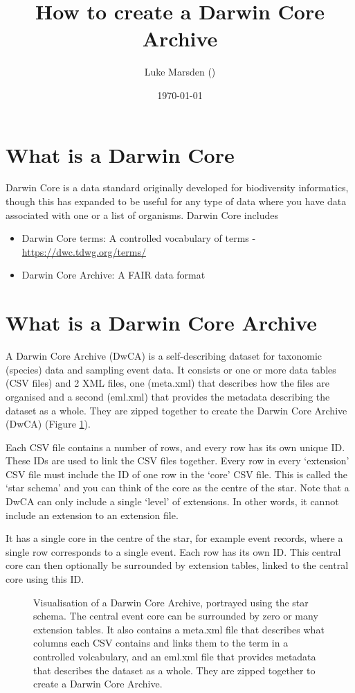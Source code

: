 \documentclass[a4paper,english, 11pt]{article}
\title{How to create a Darwin Core Archive}
\date{\today}
\author{Luke Marsden (\emailme)}
\begin{document}
\maketitle
\tableofcontents
\newpage

\section{What is a Darwin Core}
\label{s:dwc}

Darwin Core is a data standard originally developed for biodiversity informatics, though this has expanded to be useful for any type of data where you have data associated with one or a list of organisms. Darwin Core includes
\begin{itemize}
\item Darwin Core terms: A controlled vocabulary of terms - \url{https://dwc.tdwg.org/terms/}
\item Darwin Core Archive: A FAIR data format
\end{itemize} 

\section{What is a Darwin Core Archive}
\label{s:dwca}

A Darwin Core Archive (DwCA) is a self-describing dataset for taxonomic (species) data and sampling event data. It consists or one or more data tables (CSV files) and 2 XML files, one (meta.xml) that describes how the files are organised and a second  (eml.xml) that provides the metadata describing the dataset as a whole. They are zipped together to create the Darwin Core Archive (DwCA) (Figure \ref{fig:dwca}). 

Each CSV file contains a number of rows, and every row has its own unique ID. These IDs are used to link the CSV files together. Every row in every `extension' CSV file must include the ID of one row in the `core' CSV file. This is called the `star schema' and you can think of the core as the centre of the star. Note that a DwCA can only include a single `level' of extensions. In other words, it cannot include an extension to an extension file.


It has a single core in the centre of the star, for example event records, where a single row corresponds to a single event. 
Each row has its own ID.  
This central core can then optionally be surrounded by extension tables, linked to the central core using this ID. 

\begin{figure}[htb]
    \caption{\label{fig:dwca}
        Visualisation of a Darwin Core Archive, portrayed using the star schema. The
        central event core can be surrounded by zero or many extension tables.
        It also contains a meta.xml file that describes what columns each CSV contains and links them to the term in a controlled volcabulary, and an eml.xml file that provides metadata that describes the dataset as a whole. They are zipped together to create a Darwin Core Archive.
    }
\end{figure}
\end{document}
